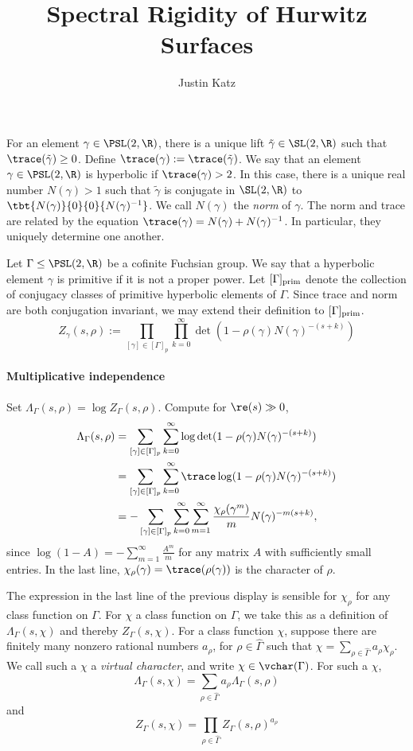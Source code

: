 \documentclass[11pt]{amsart}
\title{Spectral Rigidity of Hurwitz Surfaces}
\author{Justin Katz}
\begin{document}
\maketitle

For an element $\gamma \in \PSL(2,\R)$, there is a unique lift $\tilde{\gamma} \in \SL(2,\R)$ such that $\trace(\tilde{\gamma})\geq 0$.
Define $\trace(\gamma):= \trace(\tilde{\gamma})$.
We say that an element $\gamma \in \PSL(2,\R)$ is hyperbolic if $\trace(\gamma)>2$.
In this case, there is a unique real number $N(\gamma)>1$ such that $\tilde{\gamma}$ is conjugate in $\SL(2,\R)$ to $\tbt{N(\gamma)}{0}{0}{N(\gamma)^{-1}}$.
We call $N(\gamma)$ the \emph{norm} of $\gamma$.
The norm and trace are related by the equation $\trace(\gamma)=N(\gamma)+N(\gamma)^{-1}$.
In particular, they uniquely determine one another.

Let $\Gamma \leq \PSL(2,\R)$ be a cofinite Fuchsian group.
We say that a hyperbolic element $\gamma$ is primitive if it is not a proper power.
Let $[\Gamma]_{{\rm prim}}$ denote the collection of conjugacy classes of primitive hyperbolic elements of $\Gamma$.
Since trace and norm are both conjugation invariant, we may extend their definition to $[\Gamma]_{{\rm prim}}$.
\[ Z_{\gamma}(s,\rho):= \prod_{[\gamma]\in [\Gamma]_{p}}\prod_{k=0}^{\infty}\det(1-\rho(\gamma)N(\gamma)^{-(s+k)}) \]

\paragraph{Multiplicative independence}


Set $\Lambda_\Gamma(s,\rho)=\log Z_\Gamma(s,\rho)$.
Compute for $\re(s)\gg 0$,
\begin{align*}
	\Lambda_\Gamma(s,\rho) & =\sum_{[\gamma]\in [\Gamma]_p} \sum_{k=0}^\infty \log \det (1-\rho(\gamma)N(\gamma)^{-(s+k)})                        \\
	                       & =\sum_{[\gamma]\in [\Gamma]_p} \sum_{k=0}^\infty \trace \log (1-\rho(\gamma)N(\gamma)^{-(s+k)})                      \\
	                       & =-\sum_{[\gamma]\in [\Gamma]_p} \sum_{k=0}^\infty\sum_{m=1}^\infty \frac{\chi_\rho(\gamma^m)}{m}N(\gamma)^{-m(s+k)},
\end{align*}
since $\log(1-A)=-\sum_{m=1}^\infty \frac{A^m}{m}$ for any matrix $A$ with sufficiently small entries.
In the last line, $\chi_\rho(\gamma)=\trace(\rho(\gamma))$ is the character of $\rho$.

The expression in the last line of the previous display is sensible for $\chi_\rho$ for any class function on $\Gamma$.
For $\chi$ a class function on $\Gamma$, we take this as a definition of $\Lambda_\Gamma(s,\chi)$ and thereby $Z_\Gamma(s,\chi)$.
For a class function $\chi$, suppose there are finitely many nonzero rational numbers $a_\rho$, for $\rho \in \hat{\Gamma}$ such that  $\chi=\sum_{\rho \in \hat{\Gamma}}a_\rho \chi_\rho$.
We call such a $\chi$ a \emph{virtual character}, and write $\chi \in \vchar(\Gamma)$.
For such a $\chi$,
\[ \Lambda_\Gamma(s,\chi)=\sum_{\rho\in \hat{\Gamma}} a_\rho \Lambda_\Gamma(s,\rho) \]
and
\[ Z_\Gamma(s,\chi)=\prod_{\rho\in \hat{\Gamma}} Z_\Gamma(s,\rho)^{a_\rho} \]
\end{document}
